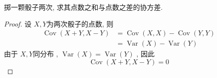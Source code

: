\documentclass[../main.tex]{subfiles}
\begin{document}
\begin{exercise}{}{}
掷一颗骰子两次, 求其点数之和与点数之差的协方差.
\end{exercise}

\begin{proof}
    设 \(  X,Y  \)为两次骰子的点数, 则 \[
  \begin{aligned}
    \operatorname{Cov}\left( X+ Y,X-Y \right)&= \operatorname{Cov}\left( X,X \right)- \operatorname{Cov}\left( Y,Y \right)\\ 
     &= \operatorname{Var}\left( X \right)- \operatorname{Var}\left( Y \right)     
  \end{aligned} 
    \] 由于 \(  X,Y  \)同分布 , \(  \operatorname{Var}\left( X \right)= \operatorname{Var}\left( Y \right)    \) , 因此 \[
    \operatorname{Cov}\left( X+ Y,X-Y \right)= 0 
    \]
\end{proof}
\end{document}
